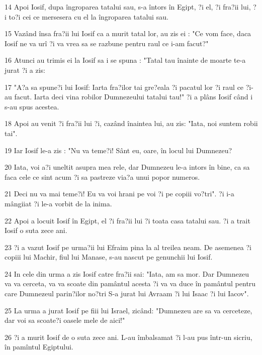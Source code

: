\par 14 Apoi Iosif, dupa îngroparea tatalui sau, s-a întors în Egipt, ?i el, ?i fra?ii lui, ?i to?i cei ce mersesera cu el la îngroparea tatalui sau.
\par 15 Vazând însa fra?ii lui Iosif ca a murit tatal lor, au zis ei : "Ce vom face, daca Iosif ne va urî ?i va vrea sa se razbune pentru raul ce i-am facut?"
\par 16 Atunci au trimis ei la Iosif sa i se spuna : "Tatal tau înainte de moarte te-a jurat ?i a zis:
\par 17 "A?a sa spune?i lui Iosif: Iarta fra?ilor tai gre?eala ?i pacatul lor ?i raul ce ?i-au facut. Iarta deci vina robilor Dumnezeului tatalui tau!" ?i a plâns Iosif când i s-au spus acestea.
\par 18 Apoi au venit ?i fra?ii lui ?i, cazând înaintea lui, au zis: "Iata, noi suntem robii tai".
\par 19 Iar Iosif le-a zis : "Nu va teme?i! Sânt eu, oare, în locul lui Dumnezeu?
\par 20 Iata, voi a?i uneltit asupra mea rele, dar Dumnezeu le-a intors în bine, ca sa faca cele ce sint acum ?i sa pastreze via?a unui popor numeros.
\par 21 Deci nu va mai teme?i! Eu va voi hrani pe voi ?i pe copiii vo?tri". ?i i-a mângiiat ?i le-a vorbit de la inima.
\par 22 Apoi a locuit Iosif în Egipt, el ?i fra?ii lui ?i toata casa tatalui sau. ?i a trait Iosif o suta zece ani.
\par 23 ?i a vazut Iosif pe urma?ii lui Efraim pina la al treilea neam. De asemenea ?i copiii lui Machir, fiul lui Manase, s-au nascut pe genunchii lui Iosif.
\par 24 In cele din urma a zis Iosif catre fra?ii sai: "Iata, am sa mor. Dar Dumnezeu va va cerceta, va va scoate din pamântul acesta ?i va va duce în pamântul pentru care Dumnezeul parin?ilor no?tri S-a jurat lui Avraam ?i lui Isaac ?i lui Iacov".
\par 25 La urma a jurat Iosif pe fiii lui Israel, zicând: "Dumnezeu are sa va cerceteze, dar voi sa scoate?i oasele mele de aici!"
\par 26 ?i a murit Iosif de o suta zece ani. L-au îmbalsamat ?i l-au pus într-un sicriu, în pamîntul Egiptului.


